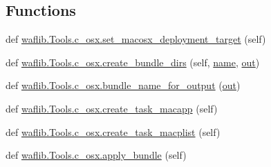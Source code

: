 \subsection*{Functions}
\begin{DoxyCompactItemize}
\item 
def \hyperlink{namespacewaflib_1_1_tools_1_1c__osx_a67e1ae8c729eb758994130363dff444f}{waflib.\+Tools.\+c\+\_\+osx.\+set\+\_\+macosx\+\_\+deployment\+\_\+target} (self)
\item 
def \hyperlink{namespacewaflib_1_1_tools_1_1c__osx_ab3377b71b8d33ceb64e0c06c684c2634}{waflib.\+Tools.\+c\+\_\+osx.\+create\+\_\+bundle\+\_\+dirs} (self, \hyperlink{lib_2expat_8h_a1b49b495b59f9e73205b69ad1a2965b0}{name}, \hyperlink{latency_8c_a71fd1c281affec034757279e4f91c50b}{out})
\item 
def \hyperlink{namespacewaflib_1_1_tools_1_1c__osx_a6a31f6c29d3177dc450458c417f324cd}{waflib.\+Tools.\+c\+\_\+osx.\+bundle\+\_\+name\+\_\+for\+\_\+output} (\hyperlink{latency_8c_a71fd1c281affec034757279e4f91c50b}{out})
\item 
def \hyperlink{namespacewaflib_1_1_tools_1_1c__osx_a3487cc571495703db801559dc8561442}{waflib.\+Tools.\+c\+\_\+osx.\+create\+\_\+task\+\_\+macapp} (self)
\item 
def \hyperlink{namespacewaflib_1_1_tools_1_1c__osx_af78321a588117b8eaec10395a24d55be}{waflib.\+Tools.\+c\+\_\+osx.\+create\+\_\+task\+\_\+macplist} (self)
\item 
def \hyperlink{namespacewaflib_1_1_tools_1_1c__osx_aab6f1a2bc87d4ef6fef8a3beb0b703d8}{waflib.\+Tools.\+c\+\_\+osx.\+apply\+\_\+bundle} (self)
\end{DoxyCompactItemize}
